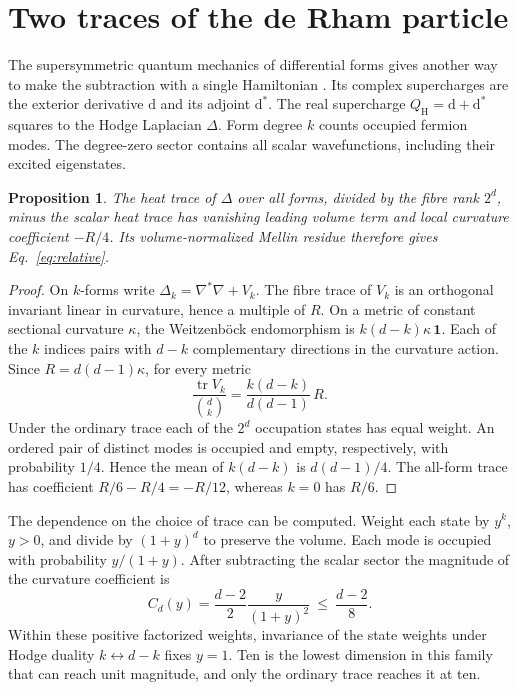 \documentclass[aps,prd,reprint,onecolumn,nofootinbib,amsmath,amssymb]{revtex4-2}
\newtheorem{proposition}{Proposition}
\begin{document}
\section{Two traces of the de Rham particle}

The supersymmetric quantum mechanics of differential forms gives another
way to make the subtraction with a single Hamiltonian
\cite{WittenMorse1982}. Its complex supercharges are the exterior
derivative \(\mathrm d\) and its adjoint \(\mathrm d^*\).
The real supercharge \(Q_{\mathrm H}=\mathrm d+\mathrm d^*\) squares to
the Hodge Laplacian \(\Delta\). Form degree \(k\) counts occupied fermion
modes. The degree-zero sector contains all scalar wavefunctions, including
their excited eigenstates.

\begin{proposition}\label{prop:forms}
The heat trace of \(\Delta\) over all forms, divided by the fibre rank
\(2^d\), minus the scalar heat trace has vanishing leading volume term
and local curvature coefficient \(-R/4\). Its volume-normalized Mellin
residue therefore gives Eq.~\eqref{eq:relative}.
\end{proposition}
\begin{proof}
On \(k\)-forms write \(\Delta_k=\nabla^*\nabla+V_k\).
The fibre trace of \(V_k\) is an orthogonal invariant linear in curvature,
hence a multiple of \(R\). On a metric of constant sectional curvature
\(\kappa\), the Weitzenböck endomorphism is \(k(d-k)\kappa\,\mathbf 1\).
Each of the \(k\) indices pairs with \(d-k\) complementary directions in
the curvature action. Since \(R=d(d-1)\kappa\), for every metric
\begin{equation}
 \frac{\operatorname{tr} V_k}{\binom{d}{k}}
 =\frac{k(d-k)}{d(d-1)}\,R .
 \label{eq:degree}
\end{equation}
Under the ordinary trace each of the \(2^d\) occupation states has equal
weight. An ordered pair of distinct modes is occupied and empty,
respectively, with probability \(1/4\). Hence the mean of \(k(d-k)\) is
\(d(d-1)/4\). The all-form trace has coefficient \(R/6-R/4=-R/12\),
whereas \(k=0\) has \(R/6\).
\end{proof}

The dependence on the choice of trace can be computed. Weight each state
by \(y^k\), \(y>0\), and divide by \((1+y)^d\) to preserve the volume.
Each mode is occupied with probability \(y/(1+y)\). After subtracting
the scalar sector the magnitude of the curvature coefficient is
\begin{equation}
 C_d(y)=\frac{d-2}{2}\frac{y}{(1+y)^2}
 \ \leq\ \frac{d-2}{8}.
 \label{eq:fugacity}
\end{equation}
Within these positive factorized weights, invariance of the state weights
under Hodge duality \(k\leftrightarrow d-k\) fixes \(y=1\). Ten is the
lowest dimension in this family that can reach unit magnitude, and only
the ordinary trace reaches it at ten.
\end{document}
